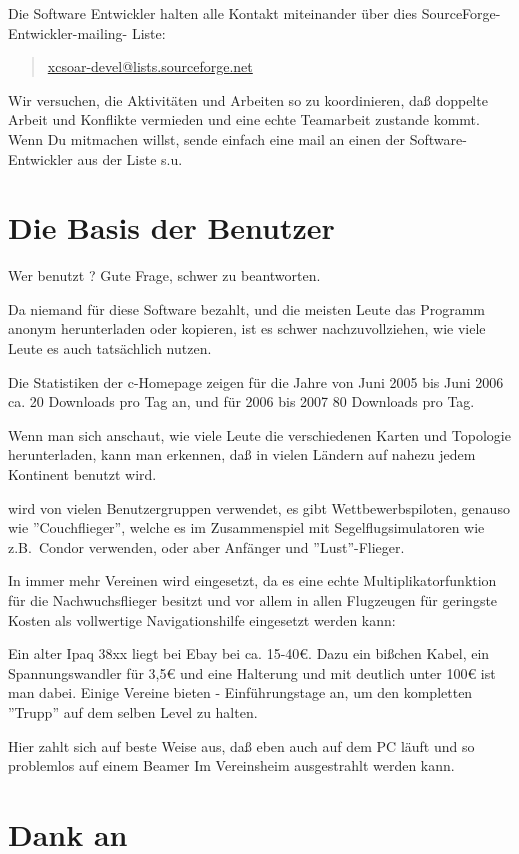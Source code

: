 Die Software Entwickler halten alle Kontakt miteinander über dies SourceForge-Entwickler-mailing- Liste:
\begin{quote}
\url{xcsoar-devel@lists.sourceforge.net}
\end{quote}
Wir versuchen, die Aktivitäten und Arbeiten so zu koordinieren, daß doppelte Arbeit und Konflikte vermieden
und eine echte Teamarbeit zustande kommt.
Wenn Du mitmachen willst, sende einfach eine mail an einen der Software-Entwickler aus der Liste s.u.

\section{Die Basis der Benutzer}

Wer benutzt \xc? Gute Frage, schwer zu beantworten.

Da niemand für diese Software bezahlt, und die meisten Leute das Programm
anonym herunterladen oder kopieren, ist es schwer nachzuvollziehen,  wie viele Leute es auch tatsächlich nutzen.

Die Statistiken der c-Homepage zeigen für die Jahre von Juni 2005 bis Juni 2006 ca. 20 Downloads pro Tag an, und für 2006 bis 2007
80 Downloads pro Tag.

Wenn man sich anschaut, wie viele Leute die verschiedenen Karten und Topologie  herunterladen, kann man erkennen, daß
\xc in vielen Ländern auf nahezu jedem Kontinent benutzt wird.

\xc wird von vielen Benutzergruppen verwendet, es gibt Wettbewerbspiloten, genauso wie ''Couchflieger'',
welche es im Zusammenspiel mit Segelflugsimulatoren wie z.B.\ Condor verwenden, oder aber Anfänger und ''Lust''-Flieger.

In immer mehr Vereinen wird \xc eingesetzt, da es eine echte Multiplikatorfunktion für die Nachwuchsflieger besitzt  und vor allem
in allen Flugzeugen für geringste Kosten als vollwertige Navigationshilfe eingesetzt werden kann:


Ein alter Ipaq 38xx liegt bei Ebay bei ca. 15-40\euro{}. Dazu ein bißchen Kabel, ein Spannungswandler für 3,5\euro{} und eine Halterung
und mit deutlich unter 100\euro{} ist man dabei.
Einige Vereine bieten \xc - Einführungstage an, um den kompletten ''Trupp'' auf dem selben Level zu halten.

Hier zahlt sich auf beste Weise aus, daß \xc eben auch auf dem PC läuft und so problemlos auf einem Beamer Im Vereinsheim
ausgestrahlt werden kann.

\section{Dank an}\label{sec:credits}


